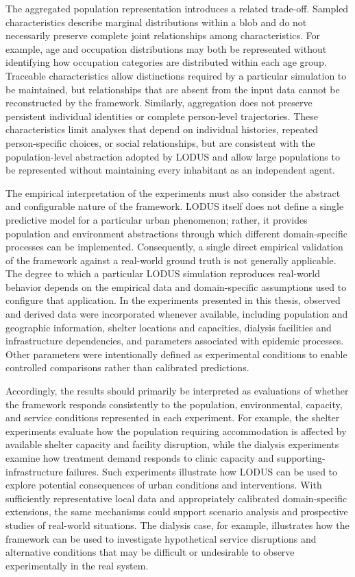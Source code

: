 The aggregated population representation introduces a related trade-off. Sampled
characteristics describe marginal distributions within a blob and do not necessarily
preserve complete joint relationships among characteristics. For example, age and
occupation distributions may both be represented without identifying how occupation
categories are distributed within each age group. Traceable characteristics allow
distinctions required by a particular simulation to be maintained, but relationships
that are absent from the input data cannot be reconstructed by the framework.
Similarly, aggregation does not preserve persistent individual identities or complete
person-level trajectories. These characteristics limit analyses that depend on individual
histories, repeated person-specific choices, or social relationships, but are consistent
with the population-level abstraction adopted by LODUS and allow large populations
to be represented without maintaining every inhabitant as an independent agent.

The empirical interpretation of the experiments must also consider the abstract and
configurable nature of the framework. LODUS itself does not define a single predictive
model for a particular urban phenomenon; rather, it provides population and environment
abstractions through which different domain-specific processes can be implemented.
Consequently, a single direct empirical validation of the framework against a real-world
ground truth is not generally applicable. The degree to which a particular LODUS
simulation reproduces real-world behavior depends on the empirical data and
domain-specific assumptions used to configure that application. In the experiments
presented in this thesis, observed and derived data were incorporated whenever
available, including population and geographic information, shelter locations and
capacities, dialysis facilities and infrastructure dependencies, and parameters associated
with epidemic processes. Other parameters were intentionally defined as experimental
conditions to enable controlled comparisons rather than calibrated predictions.

Accordingly, the results should primarily be interpreted as evaluations of whether
the framework responds consistently to the population, environmental, capacity, and
service conditions represented in each experiment. For example, the shelter experiments
evaluate how the population requiring accommodation is affected by available shelter
capacity and facility disruption, while the dialysis experiments examine how treatment
demand responds to clinic capacity and supporting-infrastructure failures. Such
experiments illustrate how LODUS can be used to explore potential consequences of
urban conditions and interventions. With sufficiently representative local data and
appropriately calibrated domain-specific extensions, the same mechanisms could support
scenario analysis and prospective studies of real-world situations. The dialysis case,
for example, illustrates how the framework can be used to investigate hypothetical
service disruptions and alternative conditions that may be difficult or undesirable to
observe experimentally in the real system.

